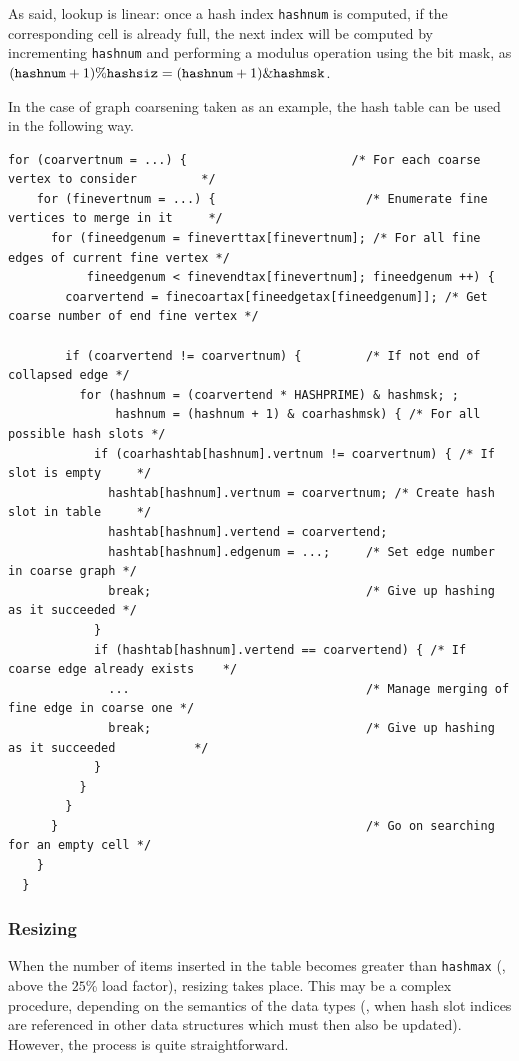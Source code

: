 As said, lookup is linear: once a hash index \texttt{hashnum} is
computed, if the corresponding cell is already full, the next index
will be computed by incrementing \texttt{hashnum} and performing
a modulus operation using the bit mask, as
$(\mbox{\texttt{hashnum}} + 1) \% \mbox{\texttt{hashsiz}} =
(\mbox{\texttt{hashnum}} + 1) \& \mbox{\texttt{hashmsk}}$.

In the case of graph coarsening taken as an example, the hash table
can be used in the following way.

\begin{lstlisting}[style=language-c]
  for (coarvertnum = ...) {                       /* For each coarse vertex to consider         */
    for (finevertnum = ...) {                     /* Enumerate fine vertices to merge in it     */
      for (fineedgenum = fineverttax[finevertnum]; /* For all fine edges of current fine vertex */
           fineedgenum < finevendtax[finevertnum]; fineedgenum ++) {
        coarvertend = finecoartax[fineedgetax[fineedgenum]]; /* Get coarse number of end fine vertex */

        if (coarvertend != coarvertnum) {         /* If not end of collapsed edge */
          for (hashnum = (coarvertend * HASHPRIME) & hashmsk; ;
               hashnum = (hashnum + 1) & coarhashmsk) { /* For all possible hash slots */
            if (coarhashtab[hashnum].vertnum != coarvertnum) { /* If slot is empty     */
              hashtab[hashnum].vertnum = coarvertnum; /* Create hash slot in table     */
              hashtab[hashnum].vertend = coarvertend;
              hashtab[hashnum].edgenum = ...;     /* Set edge number in coarse graph */
              break;                              /* Give up hashing as it succeeded */
            }
            if (hashtab[hashnum].vertend == coarvertend) { /* If coarse edge already exists    */
              ...                                 /* Manage merging of fine edge in coarse one */
              break;                              /* Give up hashing as it succeeded           */
            }
          }
        }
      }                                           /* Go on searching for an empty cell */
    }
  }   
\end{lstlisting}

\subsubsection{Resizing}

When the number of items inserted in the table becomes greater than
\texttt{hashmax} (\ie, above the $25$\% load factor), resizing takes
place. This may be a complex procedure, depending on the semantics of
the data types (\eg, when hash slot indices are referenced in other
data structures which must then also be updated). However, the process
is quite straightforward.

